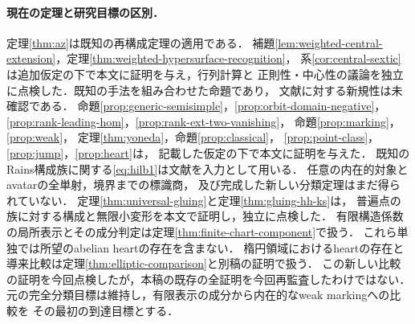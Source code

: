 \documentclass[11pt,a4paper]{ltjsarticle}
\theoremstyle{definition}
\begin{document}
\paragraph{現在の定理と研究目標の区別．}
定理\ref{thm:az}は既知の再構成定理の適用である．
補題\ref{lem:weighted-central-extension}，定理\ref{thm:weighted-hypersurface-recognition}，
系\ref{cor:central-sextic}は追加仮定の下で本文に証明を与え，行列計算と
正則性・中心性の議論を独立に点検した．既知の手法を組み合わせた命題であり，
文献に対する新規性は未確認である．
命題\ref{prop:generic-semisimple}，\ref{prop:orbit-domain-negative}，
\ref{prop:rank-leading-hom}，\ref{prop:rank-ext-two-vanishing}，
命題\ref{prop:marking}，\ref{prop:weak}，
定理\ref{thm:yoneda}，命題\ref{prop:classical}，
\ref{prop:point-class}，\ref{prop:jump}，\ref{prop:heart}は，
記載した仮定の下で本文に証明を与えた．
既知のRains構成族に関する\eqref{eq:hilb1}は文献を入力として用いる．
任意の内在的対象とavatarの全単射，境界までの標識商，
及び完成した新しい分類定理はまだ得られていない．
定理\ref{thm:universal-gluing}と定理\ref{thm:gluing-hh-ks}は，
普遍点の族に対する構成と無限小変形を本文で証明し，独立に点検した．
有限構造係数の局所表示とその成分判定は定理\ref{thm:finite-chart-component}で扱う．
これら単独では所望のabelian heartの存在を含まない．
楕円領域におけるheartの存在と導来比較は定理\ref{thm:elliptic-comparison}と別稿の証明で扱う．
この新しい比較の証明を今回点検したが，本稿の既存の全証明を今回再監査したわけではない．
元の完全分類目標は維持し，有限表示の成分から内在的なweak markingへの比較を
その最初の到達目標とする．
\end{document}
